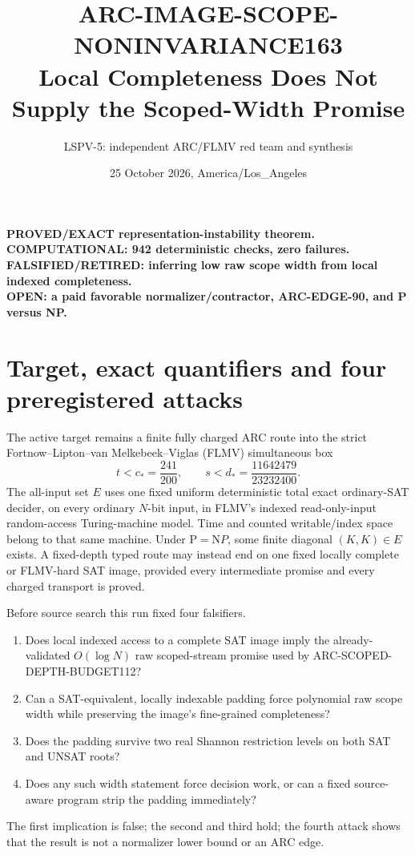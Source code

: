 \documentclass[11pt]{article}
\title{ARC-IMAGE-SCOPE-NONINVARIANCE163\\
\large Local Completeness Does Not Supply the Scoped-Width Promise}
\author{LSPV-5: independent ARC/FLMV red team and synthesis}
\date{25 October 2026, America/Los\_Angeles}
\begin{document}
\maketitle

\begin{center}
\textbf{PROVED/EXACT representation-instability theorem.}\\
\textbf{COMPUTATIONAL: 942 deterministic checks, zero failures.}\\
\textbf{FALSIFIED/RETIRED: inferring low raw scope width from local indexed completeness.}\\
\textbf{OPEN: a paid favorable normalizer/contractor, ARC-EDGE-90, and P versus NP.}
\end{center}

\section{Target, exact quantifiers and four preregistered attacks}
The active target remains a finite fully charged ARC route into the strict
Fortnow--Lipton--van Melkebeek--Viglas (FLMV) simultaneous box
\[
 t<c_*=\frac{241}{200},\qquad
 s<d_*=\frac{11642479}{23232400}.
\]
The all-input set $E$ uses one fixed uniform deterministic total exact
ordinary-SAT decider, on every ordinary $N$-bit input, in FLMV's indexed
read-only-input random-access Turing-machine model.  Time and counted
writable/index space belong to that same machine.  Under $\mathrm P=\mathrm
NP$, some finite diagonal $(K,K)\in E$ exists.  A fixed-depth typed route may
instead end on one fixed locally complete or FLMV-hard SAT image, provided
every intermediate promise and every charged transport is proved.

Before source search this run fixed four falsifiers.
\begin{enumerate}
\item Does local indexed access to a complete SAT image imply the
already-validated $O(\log N)$ raw scoped-stream promise used by
ARC-SCOPED-DEPTH-BUDGET112?
\item Can a SAT-equivalent, locally indexable padding force polynomial raw
scope width while preserving the image's fine-grained completeness?
\item Does the padding survive two real Shannon restriction levels on both
SAT and UNSAT roots?
\item Does any such width statement force decision work, or can a fixed
source-aware program strip the padding immediately?
\end{enumerate}
The first implication is false; the second and third hold; the fourth attack
shows that the result is not a normalizer lower bound or an ARC edge.
\end{document}
